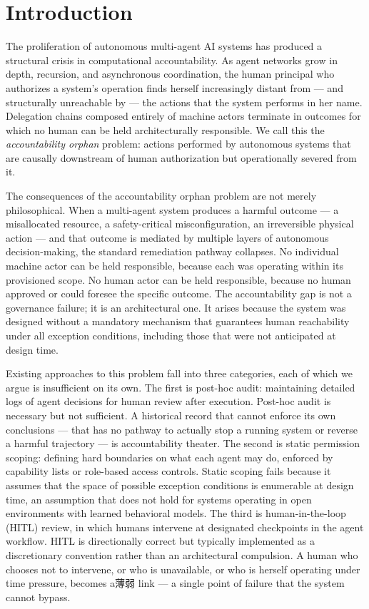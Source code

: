\section{Introduction}\label{sec:introduction}

The proliferation of autonomous multi-agent AI systems has produced a structural crisis in computational accountability. As agent networks grow in depth, recursion, and asynchronous coordination, the human principal who authorizes a system's operation finds herself increasingly distant from — and structurally unreachable by — the actions that the system performs in her name. Delegation chains composed entirely of machine actors terminate in outcomes for which no human can be held architecturally responsible. We call this the \emph{accountability orphan} problem: actions performed by autonomous systems that are causally downstream of human authorization but operationally severed from it.

The consequences of the accountability orphan problem are not merely philosophical. When a multi-agent system produces a harmful outcome — a misallocated resource, a safety-critical misconfiguration, an irreversible physical action — and that outcome is mediated by multiple layers of autonomous decision-making, the standard remediation pathway collapses. No individual machine actor can be held responsible, because each was operating within its provisioned scope. No human actor can be held responsible, because no human approved or could foresee the specific outcome. The accountability gap is not a governance failure; it is an architectural one. It arises because the system was designed without a mandatory mechanism that guarantees human reachability under all exception conditions, including those that were not anticipated at design time.

Existing approaches to this problem fall into three categories, each of which we argue is insufficient on its own. The first is post-hoc audit: maintaining detailed logs of agent decisions for human review after execution. Post-hoc audit is necessary but not sufficient. A historical record that cannot enforce its own conclusions — that has no pathway to actually stop a running system or reverse a harmful trajectory — is accountability theater. The second is static permission scoping: defining hard boundaries on what each agent may do, enforced by capability lists or role-based access controls. Static scoping fails because it assumes that the space of possible exception conditions is enumerable at design time, an assumption that does not hold for systems operating in open environments with learned behavioral models. The third is human-in-the-loop (HITL) review, in which humans intervene at designated checkpoints in the agent workflow. HITL is directionally correct but typically implemented as a discretionary convention rather than an architectural compulsion. A human who chooses not to intervene, or who is unavailable, or who is herself operating under time pressure, becomes a薄弱 link — a single point of failure that the system cannot bypass.

